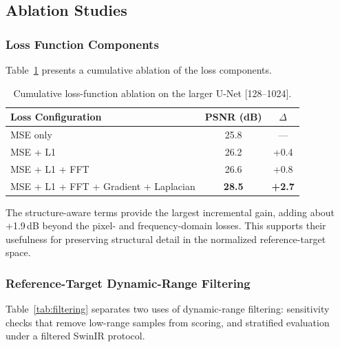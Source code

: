 \documentclass[twocolumn]{aastex631}
\begin{document}
\subsection{Ablation Studies}

\subsubsection{Loss Function Components}

Table~\ref{tab:loss_ablation} presents a cumulative ablation of the loss components.

\begin{table}[htbp]
	\centering
	\caption{Cumulative loss-function ablation on the larger U-Net [128--1024].}
	\label{tab:loss_ablation}
	\begin{tabular}{lcc}
		\toprule
		Loss Configuration                    & PSNR (dB)     & $\Delta$      \\
		\midrule
		MSE only                              & 25.8          & ---           \\
		MSE + L1                              & 26.2          & +0.4          \\
		MSE + L1 + FFT                        & 26.6          & +0.8          \\
		MSE + L1 + FFT + Gradient + Laplacian & \textbf{28.5} & \textbf{+2.7} \\
		\bottomrule
	\end{tabular}
\end{table}

The structure-aware terms provide the largest incremental gain, adding about +1.9\,dB beyond the pixel- and frequency-domain losses.
This supports their usefulness for preserving structural detail in the normalized reference-target space.

\subsubsection{Reference-Target Dynamic-Range Filtering}

Table~\ref{tab:filtering} separates two uses of dynamic-range filtering: sensitivity checks that remove low-range samples from scoring, and stratified evaluation under a filtered SwinIR protocol.
\end{document}
